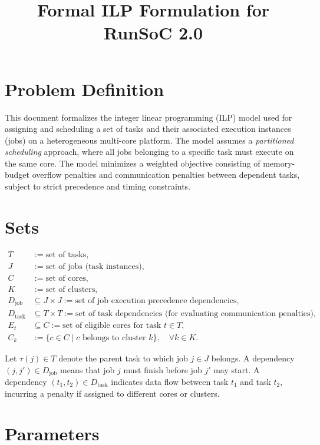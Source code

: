 \documentclass[11pt,a4paper]{article}
\title{Formal ILP Formulation for RunSoC 2.0}
\begin{document}
\maketitle

\section{Problem Definition}

This document formalizes the integer linear programming (ILP) model used for assigning and scheduling a set of tasks and their associated execution instances (jobs) on a heterogeneous multi-core platform.
The model assumes a \emph{partitioned scheduling} approach, where all jobs belonging to a specific task must execute on the same core.
The model minimizes a weighted objective consisting of memory-budget overflow penalties and communication penalties between dependent tasks, subject to strict precedence and timing constraints.

\section{Sets}

\begin{align*}
T &:= \text{set of tasks},\\
J &:= \text{set of jobs (task instances)},\\
C &:= \text{set of cores},\\
K &:= \text{set of clusters},\\
D_{\mathrm{job}} &\subseteq J \times J := \text{set of job execution precedence dependencies},\\
D_{\mathrm{task}} &\subseteq T \times T := \text{set of task dependencies (for evaluating communication penalties)},\\
E_t &\subseteq C := \text{set of eligible cores for task } t \in T,\\
C_k &:= \{c \in C \mid c \text{ belongs to cluster } k\}, \quad \forall k \in K.
\end{align*}

Let $\tau(j) \in T$ denote the parent task to which job $j \in J$ belongs.
A dependency $(j, j') \in D_{\mathrm{job}}$ means that job $j$ must finish before job $j'$ may start.
A dependency $(t_1, t_2) \in D_{\mathrm{task}}$ indicates data flow between task $t_1$ and task $t_2$, incurring a penalty if assigned to different cores or clusters.

\section{Parameters}
\end{document}

